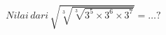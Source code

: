 \documentclass[preview]{standalone}
\begin{document}
\begin{align*}
Nilai \, dari\, \sqrt{\sqrt[3]{\sqrt[3]{3^5 \times 3^6 \times 3^7}}} =\dots?
\end{align*}
\end{document}
